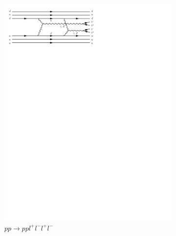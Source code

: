 \begin{figure}[h]
\begin{subfigure}[b]{0.3\textwidth}
    \includegraphics[trim={0.5cm 22cm 10cm 0cm},width=\textwidth]{../Diagrams/D8.pdf}
    \caption{$pp\rightarrow ppl^+l^-l^+l^-$}
    \label{fey:8}
  \end{subfigure}%
  ~
  \begin{subfigure}[b]{0.3\textwidth}

\end{subfigure}
\end{figure}
